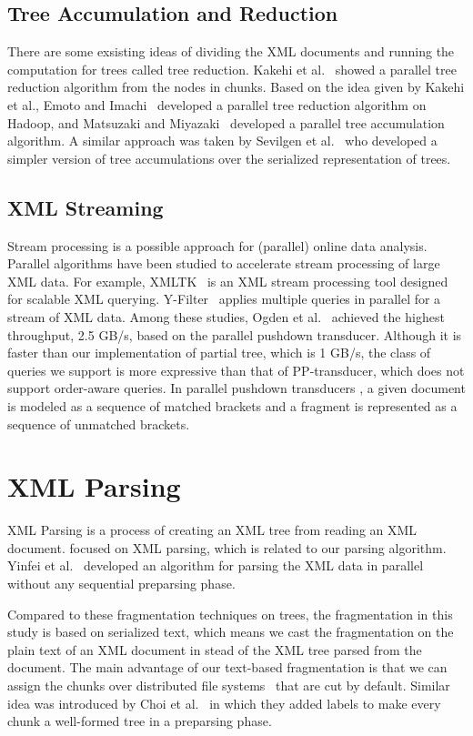 \subsection{Tree Accumulation and Reduction}

There are some exsisting ideas of dividing the XML documents and running the
computation for trees called tree reduction. Kakehi et al.~\cite{KaME07} showed
a parallel tree reduction algorithm from the nodes in chunks. Based on the idea
given by Kakehi et al., Emoto and Imachi~\cite{EmIm12} developed a parallel tree
reduction algorithm on Hadoop, and Matsuzaki and Miyazaki~\cite{MaMi16}
developed a parallel tree accumulation algorithm. A similar approach was taken
by Sevilgen et al.~\cite{SAFu05} who developed a simpler version of tree
accumulations over the serialized representation of trees.

\subsection{XML Streaming}

Stream processing is a possible approach for (parallel) online data analysis.
Parallel algorithms have been studied to accelerate stream processing of large
XML data. For example, XMLTK~\cite{AGGR02} is an XML stream processing tool
designed for scalable XML querying. Y-Filter~\cite{ZhPC10} applies multiple
queries in parallel for a stream of XML data. Among these studies, Ogden et
al.~\cite{OgTP13} achieved the highest throughput, 2.5 GB/s, based on the
parallel pushdown transducer. Although it is faster than our implementation of
partial tree, which is 1 GB/s, the class of queries we support is more
expressive than that of PP-transducer, which does not support order-aware
queries. In parallel pushdown transducers \cite{LiZZ17}, a given document is
modeled as a sequence of matched brackets and a fragment is represented as a
sequence of unmatched brackets.

\section{XML Parsing}

XML Parsing is a process of creating an XML tree from reading an XML document.
\cite{PLZC07,WZYu08} focused on XML parsing, which is related to our parsing
algorithm. Yinfei et al.~\cite{PaZC08} developed an algorithm for parsing the
XML data in parallel without any sequential preparsing phase.

Compared to these fragmentation techniques on trees, the fragmentation in this
study is based on serialized text, which means we cast the fragmentation on the
plain text of an XML document in stead of the XML tree parsed from the document.
The main advantage of our text-based fragmentation is that we can assign the
chunks over distributed file systems~\cite{dfs} that are cut by default. Similar
idea was introduced by Choi et al.~\cite{ChLL14} in which they added labels to
make every chunk a well-formed tree in a preparsing phase.

